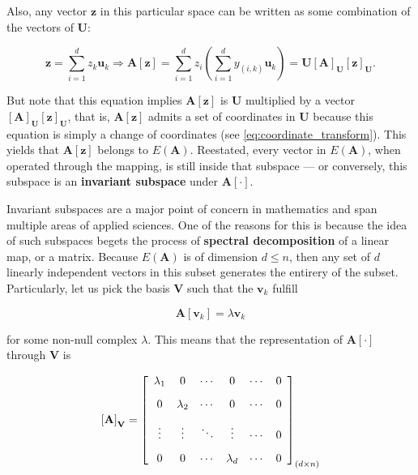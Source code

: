 	Also, any vector $\mathbf{z}$ in this particular space can be written as some combination of the vectors of $\mathbf{U}$:

\begin{equation} \mathbf{z} = \sum\limits_{i=1}^d z_k \mathbf{u}_k \Rightarrow \mathbf{A}\left[\mathbf{z}\right] = \sum\limits_{i=1}^d z_i\left(\sum\limits_{i=1}^d  y_{\left(i,k\right)} \mathbf{u}_k\right) = \mathbf{U} \left[\mathbf{A}\right]_\mathbf{U}\left[\mathbf{z}\right]_\mathbf{U} .\label{eq:application_decomp_3}\end{equation}


	But note that this equation implies $\mathbf{A}\left[\mathbf{z}\right]$ is $\mathbf{U}$ multiplied by a vector $\left[\mathbf{A}\right]_\mathbf{U}\left[\mathbf{z}\right]_\mathbf{U}$, that is, $\mathbf{A}\left[\mathbf{z}\right]$ admits a set of coordinates in $\mathbf{U}$ because this equation is simply a change of coordinates (see \eqref{eq:coordinate_transform}). This yields that $\mathbf{A}\left[\mathbf{z}\right]$ belongs to $E\left(\mathbf{A}\right)$. Reestated, every vector in $E\left(\mathbf{A}\right)$, when operated through the mapping, is still inside that subspace — or conversely, this subspace is an \textbf{invariant subspace} under $\mathbf{A}\left[\cdot\right]$.

	Invariant subspaces are a major point of concern in mathematics and span multiple areas of applied sciences. One of the reasons for this is because the idea of such subspaces begets the process of \textbf{spectral decomposition} of a linear map, or a matrix. Because $E\left(\mathbf{A}\right)$ is of dimension $d\leq n$, then any set of $d$ linearly independent vectors in this subset generates the entirery of the subset. Particularly, let us pick the basis $\mathbf{V}$ such that the $\mathbf{v}_k$ fulfill

\begin{equation} \mathbf{A}\left[\mathbf{v}_k\right] = \lambda\mathbf{v}_k\end{equation}

	\noindent for some non-null complex $\lambda$. This means that the representation of $\mathbf{A}\left[\cdot\right]$ through $\mathbf{V}$ is

\begin{equation} \left[\raisebox{0mm}[1mm][1mm]{} \mathbf{A}\right]_\mathbf{V} = \left[\begin{array}{cccccc} \lambda_1 & 0 & \cdots & 0 & \cdots & 0 \\[3mm] 0 & \lambda_2 & \cdots & 0 & \cdots & 0 \\[3mm] \vdots & \vdots & \ddots & \vdots  & \cdots & 0\\[3mm] 0 & 0 & \cdots & \lambda_d & \cdots & 0\end{array}\right]_{\left(d\times n\right)} \end{equation}

